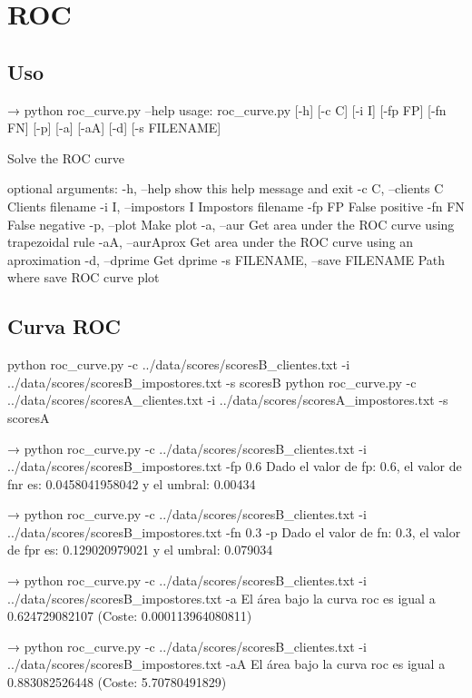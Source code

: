 \section{ROC}

\subsection{Uso}

→ python roc_curve.py --help
usage: roc_curve.py [-h] [-c C] [-i I] [-fp FP] [-fn FN] [-p] [-a] [-aA] [-d]
                    [-s FILENAME]

Solve the ROC curve

optional arguments:
  -h, --help            show this help message and exit
  -c C, --clients C     Clients filename
  -i I, --impostors I   Impostors filename
  -fp FP                False positive
  -fn FN                False negative
  -p, --plot            Make plot
  -a, --aur             Get area under the ROC curve using trapezoidal rule
  -aA, --aurAprox       Get area under the ROC curve using an aproximation
  -d, --dprime          Get dprime
  -s FILENAME, --save FILENAME
                        Path where save ROC curve plot

\subsection{Curva ROC}

python roc_curve.py -c ../data/scores/scoresB_clientes.txt -i ../data/scores/scoresB_impostores.txt  -s scoresB
python roc_curve.py -c ../data/scores/scoresA_clientes.txt -i ../data/scores/scoresA_impostores.txt  -s scoresA

→ python roc_curve.py -c ../data/scores/scoresB_clientes.txt -i ../data/scores/scoresB_impostores.txt  -fp 0.6   
Dado el valor de fp: 0.6, el valor de fnr es: 0.0458041958042 y el umbral: 0.00434 

→ python roc_curve.py -c ../data/scores/scoresB_clientes.txt -i ../data/scores/scoresB_impostores.txt  -fn 0.3 -p
Dado el valor de fn: 0.3, el valor de fpr es: 0.129020979021 y el umbral: 0.079034 

→ python roc_curve.py -c ../data/scores/scoresB_clientes.txt -i ../data/scores/scoresB_impostores.txt  -a       
El área bajo la curva roc es igual a 0.624729082107 (Coste: 0.000113964080811)

→ python roc_curve.py -c ../data/scores/scoresB_clientes.txt -i ../data/scores/scoresB_impostores.txt  -aA
El área bajo la curva roc es igual a 0.883082526448 (Coste: 5.70780491829)

